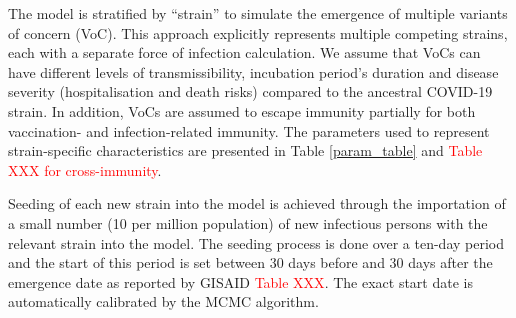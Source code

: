 
The model is stratified by ``strain'' to simulate the emergence of multiple variants of concern (VoC).
This approach explicitly represents multiple competing strains, each with a separate force of infection calculation.
We assume that VoCs can have different levels of transmissibility, incubation period's duration and disease severity 
(hospitalisation and death risks) compared to the ancestral COVID-19 strain. In addition, VoCs are assumed to escape 
immunity partially for both vaccination- and infection-related immunity. The parameters used to represent strain-specific
characteristics are presented in Table \ref{param_table} and \textcolor{red}{Table XXX for cross-immunity}.

Seeding of each new strain into the model is achieved through the importation of a small number (10 per million population) of new infectious persons with the relevant strain into the model.
The seeding process is done over a ten-day period and the start of this period is set between 30 days before and 30 days after the emergence date
as reported by GISAID \textcolor{red}{Table XXX}. The exact start date is automatically calibrated by the MCMC algorithm.
